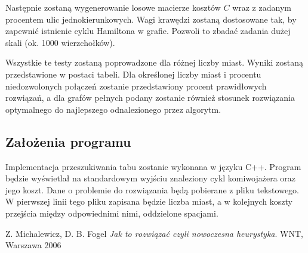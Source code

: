 \documentclass[11pt,a4paper,twoside]{article}
\begin{document}
Następnie zostaną wygenerowanie losowe macierze kosztów $C$ wraz z zadanym procentem ulic jednokierunkowych. Wagi krawędzi zostaną dostosowane tak, by zapewnić istnienie cyklu Hamiltona w grafie. Pozwoli to zbadać zadania dużej skali (ok. 1000 wierzchołków).
	
Wszystkie te testy zostaną poprowadzone dla różnej liczby miast. Wyniki zostaną przedstawione w postaci tabeli. Dla określonej liczby miast i procentu niedozwolonych połączeń zostanie przedstawiony procent prawidłowych rozwiązań, a dla grafów pełnych podany zostanie również stosunek rozwiązania optymalnego do najlepszego odnalezionego przez algorytm. 
\subsection{Założenia programu}
Implementacja przeszukiwania tabu zostanie wykonana w języku C++. Program będzie wyświetlał na standardowym wyjściu znaleziony cykl komiwojażera oraz jego koszt. Dane o problemie do rozwiązania będą pobierane z pliku tekstowego. W pierwszej linii tego pliku zapisana będzie liczba miast, a w kolejnych koszty przejścia między odpowiednimi nimi, oddzielone spacjami.
  
\begin{thebibliography}{9}
Z. Michalewicz, D. B. Fogel
\emph{Jak to rozwiązać czyli nowoczesna heurystyka}.
WNT, Warszawa 2006
\end{thebibliography}
\end{document}
